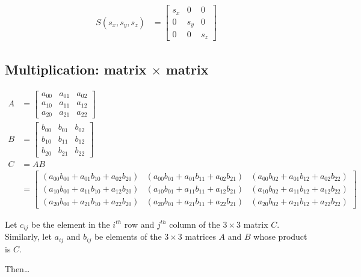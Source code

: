 \documentclass[twoside]{article}
\begin{document}
\begin{align*}
  S( s_x, s_y, s_z ) & = \left[ \begin{array}{rrr}
    s_x & 0 & 0 \\
    0 & s_y & 0 \\
    0 & 0 & s_z
    \end{array} \right]
  \end{align*}

\subsection{Multiplication: matrix $\times$ matrix}

\begin{align*}
  A & = \left[ \begin{array}{rrr}
    a_{00} & a_{01} & a_{02} \\
    a_{10} & a_{11} & a_{12} \\
    a_{20} & a_{21} & a_{22} 
    \end{array} \right] \\
  B & = \left[ \begin{array}{rrr}
    b_{00} & b_{01} & b_{02} \\
    b_{10} & b_{11} & b_{12} \\
    b_{20} & b_{21} & b_{22} 
    \end{array} \right] \\
  C & = AB \\
   & = \left[ \begin{array}{rrr}
    (a_{00} b_{00} + a_{01} b_{10} + a_{02} b_{20}) &
    (a_{00} b_{01} + a_{01} b_{11} + a_{02} b_{21}) &
    (a_{00} b_{02} + a_{01} b_{12} + a_{02} b_{22}) \\
    (a_{10} b_{00} + a_{11} b_{10} + a_{12} b_{20}) &
    (a_{10} b_{01} + a_{11} b_{11} + a_{12} b_{21}) &
    (a_{10} b_{02} + a_{11} b_{12} + a_{12} b_{22}) \\
    (a_{20} b_{00} + a_{21} b_{10} + a_{22} b_{20}) &
    (a_{20} b_{01} + a_{21} b_{11} + a_{22} b_{21}) &
    (a_{20} b_{02} + a_{21} b_{12} + a_{22} b_{22}) 
    \end{array} \right]
  \end{align*}

Let $c_{ij}$ be the element in the $i^{th}$ row and $j^{th}$ column of
the $3 \times 3$ matrix $C$.
Similarly, let $a_{ij}$ and $b_{ij}$ be elements of the $3 \times 3$
matrices $A$ and $B$ whose product is $C$.

Then\ldots
\end{document}
